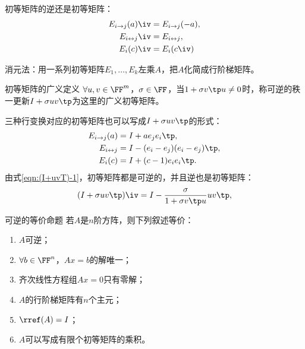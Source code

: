\begin{corollary}
	初等矩阵的逆还是初等矩阵：
	\begin{subequations}
		\begin{align}
			E_{i\to j}(a)\iv&=E_{i\to j}(-a),\\
			E_{i\leftrightarrow j}\iv&=E_{i\leftrightarrow j},\\
			E_i(c)\iv&=E_i(c\iv)
		\end{align}
	\end{subequations}
\end{corollary}

\begin{remark}
	消元法：用一系列初等矩阵$E_1,\ldots,E_k$左乘$A$，把$A$化简成行阶梯矩阵。
\end{remark}

\begin{definition}
	{初等矩阵的广义定义}{}
	$\forall u,v\in\FF^m$，$\sigma\in\FF$，当$1+\sigma v\tp u\neq0$时，称可逆的秩一更新$I+\sigma uv\tp$为这里的广义初等矩阵。
\end{definition}
\begin{remark}
	三种行变换对应的初等矩阵也可以写成$I+\sigma uv\tp$的形式：
	\begin{subequations}
		\begin{align}
			E_{i\to j}(a)&=I+ae_je_i\tp,\\
			E_{i\leftrightarrow j}&=I-(e_i-e_j)(e_i-e_j)\tp,\\
			E_i(c)&=I+(c-1)e_ie_i\tp.
		\end{align}
	\end{subequations}
	由式\eqref{eqn:(I+uvT)-1}，初等矩阵都是可逆的，并且逆也是初等矩阵：
	\begin{equation}
		(I+\sigma uv\tp)\iv=I-\frac{\sigma}{1+\sigma v\tp u}uv\tp,
	\end{equation}
\end{remark}

\begin{theorem}
	{可逆的等价命题}{}
	若$A$是$n$阶方阵，则下列叙述等价：
	\begin{enumerate}
		\item $A$可逆；
		\item $\forall b\in\FF^n$，$Ax=b$的解唯一；
		\item 齐次线性方程组$Ax=0$只有零解；
		\item $A$的行阶梯矩阵有$n$个主元；
		\item $\rref(A)=I$；
		\item $A$可以写成有限个初等矩阵的乘积。
	\end{enumerate}
\end{theorem}

